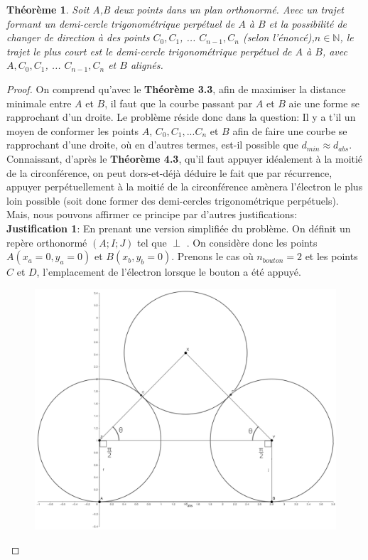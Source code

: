 \documentclass{amsart}
\newtheorem{theorem}{Théorème}[section]
\theoremstyle{definition}
\theoremstyle{remark}
\numberwithin{equation}{section}
\renewcommand*{\overrightarrow}[1]{\vbox{\halign{##\cr 
  \tiny\rightarrowfill\cr\noalign{\nointerlineskip\vskip1pt} 
  $#1\mskip2mu$\cr}}}
\begin{document}
\begin{theorem}
  Soit A,B deux points dans un plan orthonormé. Avec un trajet formant un demi-cercle trigonométrique perpétuel de $A$ à $B$ et la possibilité de changer de direction à des points $C_0, C_1$, ... $C_{n-1}, C_{n}$ (selon l'énoncé),$n\in\mathbb{N}$, le trajet le plus court
  est le demi-cercle trigonométrique perpétuel de $A$ à $B$, avec $A,C_0, C_1$, ... $C_{n-1}, C_{n}$ et $B$ alignés.
\end{theorem}

\begin{proof}
  On comprend qu'avec le \textbf{Théorème 3.3}, afin de maximiser la distance minimale entre $A$ et $B$, il faut que la courbe passant par $A$ et $B$ aie une forme se rapprochant d'un droite. 
  Le problème réside donc dans la question: Il y a t'il un moyen de conformer les points $A$, $C_0, C_1, ... C_n$ et $B$ afin de faire une courbe se rapprochant d'une droite, où en d'autres termes, est-il possible que $d_{min}\approx d_{abs}$.\\

  Connaissant, d'après le \textbf{Théorème 4.3}, qu'il faut appuyer idéalement à la moitié de la circonférence, on peut dors-et-déjà déduire le fait que par récurrence, appuyer perpétuellement à la moitié de la circonférence amènera l'électron le plus loin 
  possible (soit donc former des demi-cercles trigonométrique perpétuels). Mais, nous pouvons affirmer ce principe par d'autres justifications:\\

  \textbf{Justification 1}: En prenant une version simplifiée du problème. On définit un repère orthonormé $(A;I;J)$ tel que \overrightarrow{AJ} $\perp$ \overrightarrow{AB}. On considère donc les points $A(x_a=0,y_a=0)$ et $B(x_b,y_b=0)$.
  Prenons le cas où $n_{bouton}=2$ et les points $C$ et $D$, l'emplacement de l'électron lorsque le bouton a été appuyé.

  \begin{figure}[H]
    \centering
    \includegraphics[scale=0.2]{three_circles.png}
    \caption{}
  \end{figure}


\end{proof}
\end{document}
